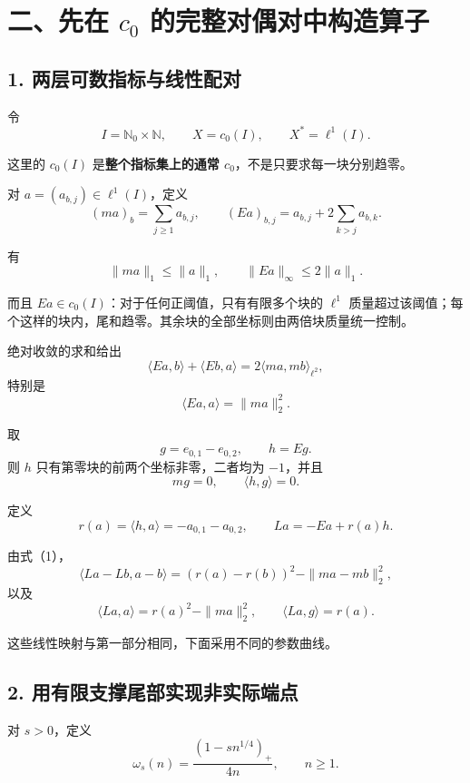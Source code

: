 \documentclass[UTF8,fontset=fandol,11pt,a4paper]{ctexart}
\begin{document}
\section{\texorpdfstring{二、先在 $c_0$ 的完整对偶对中构造算子}{二、先在 c\_0 的完整对偶对中构造算子}}\label{ux4e8cux5148ux5728-c_0-ux7684ux5b8cux6574ux5bf9ux5076ux5bf9ux4e2dux6784ux9020ux7b97ux5b50}

\subsection{1. 两层可数指标与线性配对}\label{ux4e24ux5c42ux53efux6570ux6307ux6807ux4e0eux7ebfux6027ux914dux5bf9}

令 \[
I=\mathbb N_0\times\mathbb N,\qquad
X=c_0(I),\qquad X^*=\ell^1(I).
\]

这里的 $c_0(I)$ 是\textbf{整个指标集上的通常 $c_0$}，不是只要求每一块分别趋零。

对 $a=(a_{b,j})\in\ell^1(I)$，定义 \[
(ma)_b=\sum_{j\ge1}a_{b,j},
\qquad
(Ea)_{b,j}=a_{b,j}+2\sum_{k>j}a_{b,k}.
\]

有 \[
\|ma\|_1\le\|a\|_1,\qquad
\|Ea\|_\infty\le2\|a\|_1.
\]

而且 $Ea\in c_0(I)$：对于任何正阈值，只有有限多个块的 $\ell^1$ 质量超过该阈值；每个这样的块内，尾和趋零。其余块的全部坐标则由两倍块质量统一控制。

绝对收敛的求和给出 \[
\langle Ea,b\rangle+\langle Eb,a\rangle
=2\langle ma,mb\rangle_{\ell^2},
\] 特别是 \[
\langle Ea,a\rangle=\|ma\|_2^2.
\tag{1}
\]

取 \[
g=e_{0,1}-e_{0,2},\qquad h=Eg.
\] 则 $h$ 只有第零块的前两个坐标非零，二者均为 $-1$，并且 \[
mg=0,\qquad \langle h,g\rangle=0.
\]

定义 \[
r(a)=\langle h,a\rangle=-a_{0,1}-a_{0,2},
\qquad
La=-Ea+r(a)h.
\]

由式（1）， \[
\boxed{
\langle La-Lb,a-b\rangle
=(r(a)-r(b))^2-\|ma-mb\|_2^2,
}
\tag{2}
\] 以及 \[
\boxed{
\langle La,a\rangle=r(a)^2-\|ma\|_2^2,
\qquad
\langle La,g\rangle=r(a).
}
\tag{3}
\]

这些线性映射与第一部分相同，下面采用不同的参数曲线。

\subsection{2. 用有限支撑尾部实现非实际端点}\label{ux7528ux6709ux9650ux652fux6491ux5c3eux90e8ux5b9eux73b0ux975eux5b9eux9645ux7aefux70b9}

对 $s>0$，定义 \[
\omega_s(n)=\frac{(1-sn^{1/4})_+}{4n},
\qquad n\ge1.
\tag{4}
\]
\end{document}
